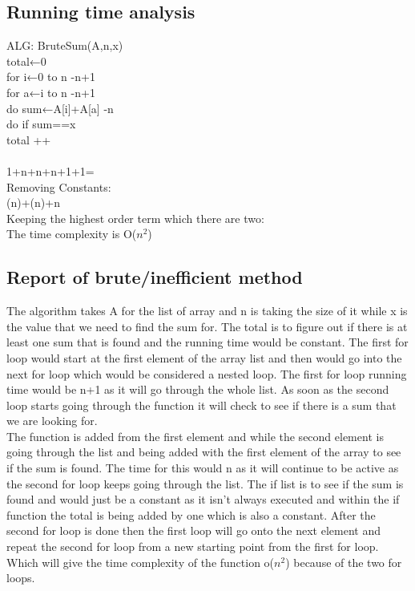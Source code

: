 \documentclass[12pt]{article}
\begin{document}
	\subsection{Running time analysis}
	ALG: BruteSum(A,n,x) \\
	\indent \indent total←0 \indent \indent \indent \indent \indent \indent {}   \\
	\indent \indent for i←0 to n \indent \indent \indent \indent \indent \indent -n+1\\
	\indent \indent \indent for a←i to n \indent \indent \indent \indent \indent -n+1\\
	\indent \indent \indent \indent do sum←A[i]+A[a] \indent \indent  -n\\
	\indent \indent \indent \indent do if sum==x \indent \indent {} \\
	\indent \indent \indent \indent \indent \indent total ++ \indent \indent {}\\ \\
	1+n+n+n+1+1= \\
	Removing Constants: \\
	(n)+(n)+n \\
	Keeping the highest order term which there are two: \\
	The time complexity is O($ n^2 $) \\
	\subsection{Report of brute/inefficient method}
	\indent \indent The algorithm takes A for the list of array and n is taking the size of it while x is the value that we need to find the sum for. The total is to figure out if there is at least one sum that is found and the running time would be constant. The first for loop would start at the first element of the array list and then would go into the next for loop which would be considered a nested loop. The first for loop running time would be n+1 as it will go through the whole list. As soon as the second loop starts going through the function it will check to see if there is a sum that we are looking for. \\
	\indent The function is added from the first element and while the second element is going through the list and being added with the first element of the array to see if the sum is found. The time for this would n as it will continue to be active as the second for loop keeps going through the list. The if list is to see if the sum is found and would just be a constant as it isn’t always executed and within the if function the total is being added by one which is also a constant. After the second for loop is done then the first loop will go onto the next element and repeat the second for loop from a new starting point from the first for loop. Which will give the time complexity of the function o($n^2$) because of the two for loops.
	
\end{document}
